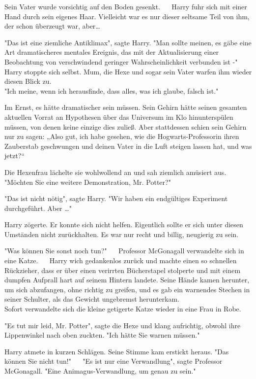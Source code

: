{Sein Vater wurde vorsichtig auf den Boden gesenkt. ~ ~Harry fuhr sich mit einer Hand durch sein eigenes Haar. Vielleicht war es nur dieser seltsame Teil von ihm, der schon überzeugt war, aber…

"Das ist eine ziemliche Antiklimax", sagte Harry. "Man sollte meinen, es gäbe eine Art dramatischeres mentales Ereignis, das mit der Aktualisierung einer Beobachtung von verschwindend geringer Wahrscheinlichkeit verbunden ist -"\\ Harry stoppte sich selbst. Mum, die Hexe und sogar sein Vater warfen ihm wieder diesen Blick zu.\\ "Ich meine, wenn ich herausfinde, dass alles, was ich glaube, falsch ist." ~ ~

Im Ernst, es hätte dramatischer sein müssen. Sein Gehirn hätte seinen gesamten aktuellen Vorrat an Hypothesen über das Universum im Klo hinunterspülen müssen, von denen keine einzige dies zuließ. Aber stattdessen schien sein Gehirn nur zu sagen: „Also gut, ich habe gesehen, wie die Hogwarts-Professorin ihren Zauberstab geschwungen und deinen Vater in die Luft steigen lassen hat, und was jetzt?“ ~ ~

Die Hexenfrau lächelte sie wohlwollend an und sah ziemlich amüsiert aus. "Möchten Sie eine weitere Demonstration, Mr. Potter?" ~ ~

"Das ist nicht nötig", sagte Harry. "Wir haben ein endgültiges Experiment durchgeführt. Aber …"

Harry zögerte. Er konnte sich nicht helfen. Eigentlich sollte er sich unter diesen Umständen nicht zurückhalten. Es war nur recht und billig, neugierig zu sein.

"Was können Sie sonst noch tun?" ~ ~Professor McGonagall verwandelte sich in eine Katze. ~ ~Harry wich gedankenlos zurück und machte einen so schnellen Rückzieher, dass er über einen verirrten Bücherstapel stolperte und mit einem dumpfen Aufprall hart auf seinem Hintern landete. Seine Hände kamen herunter, um sich abzufangen, ohne richtig zu greifen, und es gab ein warnendes Stechen in seiner Schulter, als das Gewicht ungebremst herunterkam. ~ ~\\ Sofort verwandelte sich die kleine getigerte Katze wieder in eine Frau in Robe.

"Es tut mir leid, Mr. Potter", sagte die Hexe und klang aufrichtig, obwohl ihre Lippenwinkel nach oben zuckten. "Ich hätte Sie warnen müssen." ~ ~

Harry atmete in kurzen Schlägen. Seine Stimme kam erstickt heraus. "Das können Sie nicht tun!" ~ ~"Es ist nur eine Verwandlung", sagte Professor McGonagall. "Eine Animagus-Verwandlung, um genau zu sein." ~ ~

}
